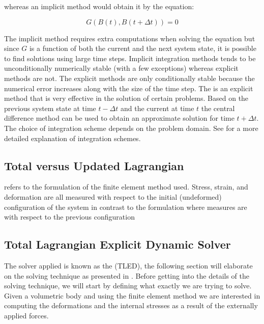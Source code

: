 whereas an implicit method would obtain it by the equation:

\begin{equation}
G( B(t), B(t + \Delta t)) = 0
\end{equation}

The implicit method requires extra computations when solving the
equation but since $G$ is a function of both the current and the next system
state, it is possible to find solutions using
large time steps. Implicit integration methods tends to be unconditionally numerically
stable (with a few exceptions) whereas explicit methods are not. The explicit methods are
only conditionally stable because the numerical error increases along
with the size of the time step. The  is an
explicit method that is very effective in the solution of certain
problems. Based on the previous system state at time $t - \Delta t$
and the current at time $t$ the central difference method can be used
to obtain an approximate solution for time $t + \Delta t$. 
The choice of integration scheme depends on the problem
domain. See  for a more detailed explanation of
integration schemes.


\subsection{Total versus Updated Lagrangian}
 refers
to the formulation of the finite element method used. Stress, strain,
and deformation are all measured with respect to the initial
(undeformed) configuration of the system in contrast to the
 formulation where measures are with respect
to the previous configuration 


\subsection{Total Lagrangian Explicit Dynamic Solver }
\label{sec:tled_solver}
The solver applied is known as the  (TLED), the following section will
elaborate on the solving technique as presented in .
%
Before getting into the details of the solving technique, we will start
by defining what exactly we are trying to solve.
Given a volumetric body and using the finite element method we
are interested in computing the deformations and the internal stresses as a
result of the externally applied forces. \\

